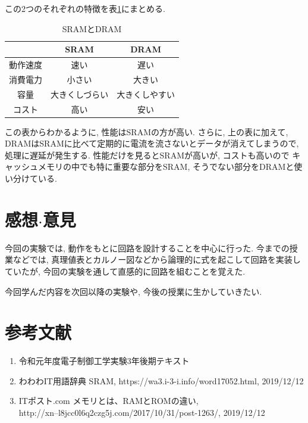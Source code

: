 \documentclass[titlepage]{jsarticle}
\begin{document}
  この2つのそれぞれの特徴を表\ref{tab:SRAM_and_DRAM}にまとめる.

  \begin{table}[h]
    \centering
    \caption{SRAMとDRAM}
    \label{tab:SRAM_and_DRAM}
    \begin{tabular}{c|cc}
      & SRAM & DRAM \\ \hline
      動作速度 & 速い & 遅い \\
      消費電力 & 小さい & 大きい \\
      容量 & 大きくしづらい & 大きくしやすい \\
      コスト & 高い & 安い \\
    \end{tabular}
  \end{table}

  この表からわかるように, 性能はSRAMの方が高い.
  さらに, 上の表に加えて, DRAMはSRAMに比べて定期的に電流を流さないとデータが消えてしまうので,
  処理に遅延が発生する.
  性能だけを見るとSRAMが高いが, コストも高いので
  キャッシュメモリの中でも特に重要な部分をSRAM, そうでない部分をDRAMと使い分けている.
\section{感想$\cdot$意見}
  今回の実験では, 動作をもとに回路を設計することを中心に行った.
  今までの授業などでは, 真理値表とカルノー図などから論理的に式を起こして回路を実装していたが,
  今回の実験を通して直感的に回路を組むことを覚えた.

  今回学んだ内容を次回以降の実験や, 今後の授業に生かしていきたい.
\section*{参考文献}
  \begin{enumerate}
    \item 令和元年度電子制御工学実験3年後期テキスト
    \item わわわIT用語辞典 SRAM, https://wa3.i-3-i.info/word17052.html, 2019/12/12
    \item ITポスト.com メモリとは、RAMとROMの違い,
      \\http://xn--l8jcc0l6q2czg5j.com/2017/10/31/post-1263/, 2019/12/12
  \end{enumerate}
\end{document}
